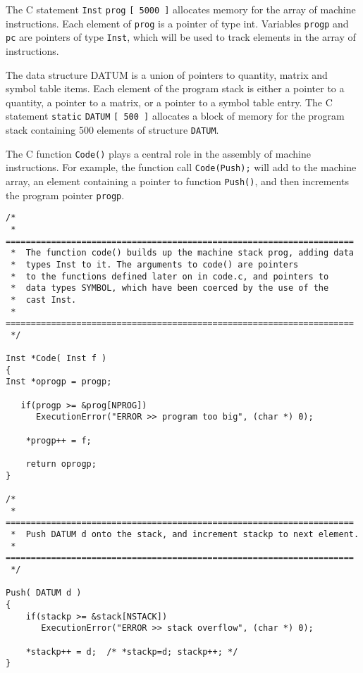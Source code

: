 \vspace{0.05 in}\noindent
The C statement {\tt Inst} {\tt prog} {\tt [ 5000 ]} allocates
memory for the array of machine instructions.
Each element of {\tt prog} is a pointer of type int.
Variables {\tt *progp} and {\tt *pc} are pointers of type {\tt Inst},
which will be used to track elements in the array of instructions.

\vspace{0.15 in}
\noindent\hspace{0.50 in}
The data structure DATUM is a union of
pointers to quantity, matrix and symbol table items.
Each element of the program stack is either a pointer
to a quantity, a pointer to a matrix, or a pointer to a symbol table entry.
The C statement {\tt static} {\tt DATUM} {\tt [ 500 ]} allocates
a block of memory for the program stack containing
500 elements of structure {\tt DATUM}.

\vspace{0.15 in}
\noindent\hspace{0.50 in}
The C function {\tt Code()} plays a central role in the assembly of 
machine instructions. For example, the function call {\tt Code(Push);}
will add to the machine array, an element containing a pointer to
function {\tt Push()}, and then increments the program pointer {\tt progp}.

\begin{footnotesize}
\begin{verbatim}
/*  
 *  ===================================================================== 
 *  The function code() builds up the machine stack prog, adding data
 *  types Inst to it. The arguments to code() are pointers
 *  to the functions defined later on in code.c, and pointers to
 *  data types SYMBOL, which have been coerced by the use of the 
 *  cast Inst.
 *  ===================================================================== 
 */ 

Inst *Code( Inst f )
{
Inst *oprogp = progp;

   if(progp >= &prog[NPROG])
      ExecutionError("ERROR >> program too big", (char *) 0);

    *progp++ = f;

    return oprogp;
}

/* 
 *  ===================================================================== 
 *  Push DATUM d onto the stack, and increment stackp to next element.
 *  ===================================================================== 
 */ 

Push( DATUM d )
{
    if(stackp >= &stack[NSTACK])
       ExecutionError("ERROR >> stack overflow", (char *) 0);

    *stackp++ = d;  /* *stackp=d; stackp++; */
}
\end{verbatim}
\end{footnotesize}

